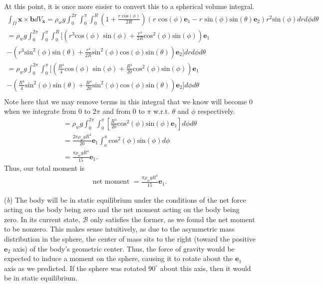 At this point, it is once more easier to convert this to a spherical volume integral.
\begin{gather*}
    \int_\Omega\bm{x}\times\bm{b}dV\bm{_x}=\rho_wg\int_0^{2\pi}\int_0^{\pi}\int_0^R(1+\frac{r\text{ cos}(\phi)}{2R})(r\text{ cos}(\phi)\bm{e}_1-r\text{ sin}(\phi)\text{sin}(\theta)\bm{e}_2)r^2\text{sin}(\phi)dr d\phi d\theta\\
    =\rho_wg\int_0^{2\pi}\int_0^{\pi}\int_0^R[(r^3\text{cos}(\phi)\text{ sin}(\phi)+\frac{r^4}{2R}\text{cos}^2(\phi)\text{sin}(\phi))\bm{e}_1\\-(r^3\text{sin}^2(\phi)\text{sin}(\theta)+\frac{r^4}{2R}\text{sin}^2(\phi)\text{cos}(\phi)\text{sin}(\theta))\bm{e}_2]dr d\phi d\theta\\
    =\rho_w g\int_0^{2\pi}\int_0^{\pi}[(\frac{R^4}{4}\text{cos}(\phi)\text{ sin}(\phi)+\frac{R^4}{20}\text{cos}^2(\phi)\text{sin}(\phi))\bm{e}_1\\
    -(\frac{R^4}{4}\text{sin}^2(\phi)\text{sin}(\theta)+\frac{R^4}{20}\text{sin}^2(\phi)\text{cos}(\phi)\text{sin}(\theta))\bm{e}_2] d\phi d\theta\\
\end{gather*}
Note here that we may remove terms in this integral that we know will become 0 when we integrate from 0 to $2\pi$ and from 0 to $\pi$ w.r.t. $\theta$ and $\phi$ respectively.
\begin{gather*}
    =\rho_w g\int_0^{2\pi}\int_0^{\pi}[\frac{R^4}{20}\text{cos}^2(\phi)\text{sin}(\phi)\bm{e}_1] d\phi d\theta\\
    =\frac{2\pi\rho_wgR^4}{20}\bm{e}_1\int_o^{\pi}\text{cos}^2(\phi)\text{sin}(\phi) d\phi\\
    =\frac{\pi\rho_wgR^4}{15}\bm{e}_1.
\end{gather*}
Thus, our total moment is
\begin{gather*}
    \text{net moment }=\frac{\pi\rho_wgR^4}{15}\bm{e}_1.
\end{gather*}

(\textit{b}) The body will be in static equilibrium under the conditions of the net force acting on the body being zero and the net moment acting on the body being zero. In its current state, $\mathcal{B}$ only satisfies the former, as we found the net moment to be nonzero. This makes sense intuitively, as due to the asymmetric mass distribution in the sphere, the center of mass sits to the right (toward the positive $\bm{e}_2$ axis) of the body's geometric center. Thus, the force of gravity would be expected to induce a moment on the sphere, causing it to rotate about the $\bm{e}_1$ axis as we predicted. If the sphere was rotated $90^{\circ}$ about this axis, then it would be in static equilibrium.

